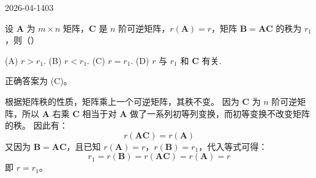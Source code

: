 \begin{mistake}{2026-04-14}{03}

\begin{problemcontent}
设 \(\mathbf{A}\) 为 \(m \times n\) 矩阵，\(\mathbf{C}\) 是 \(n\) 阶可逆矩阵，\(r(\mathbf{A}) = r\)，矩阵 \(\mathbf{B} = \mathbf{AC}\) 的秩为 \(r_1\)，则（\quad）

(A) \(r > r_1\). \qquad (B) \(r < r_1\). \qquad (C) \(r = r_1\). \qquad (D) \(r\) 与 \(r_1\) 和 \(\mathbf{C}\) 有关.
\end{problemcontent}

\begin{solutioncontent}
正确答案为 (C)。

根据矩阵秩的性质，矩阵乘上一个可逆矩阵，其秩不变。
因为 \(\mathbf{C}\) 为 \(n\) 阶可逆矩阵，所以 \(\mathbf{A}\) 右乘 \(\mathbf{C}\) 相当于对 \(\mathbf{A}\) 做了一系列初等列变换，而初等变换不改变矩阵的秩。
因此有：
\[ r(\mathbf{AC}) = r(\mathbf{A}) \]
又因为 \(\mathbf{B} = \mathbf{AC}\)，且已知 \(r(\mathbf{A}) = r\)，\(r(\mathbf{B}) = r_1\)，代入等式可得：
\[ r_1 = r(\mathbf{B}) = r(\mathbf{AC}) = r(\mathbf{A}) = r \]
即 \(r = r_1\)。
\end{solutioncontent}


\end{mistake}
